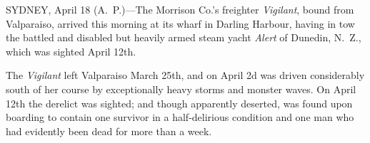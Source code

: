 \documentclass{newspaper1920}
\def\minipageheight{37}
\begin{document}
\begin{multicols}{3}




\halfrule



\halfrule



\halfrule



\halfrule



\halfrule



\fullrule



\halfrule



\halfrule



\columnbreak

\noindent
\begin{minipage}[t][\minipageheight\baselineskip]{2\columnwidth+1\columnsep}
\fancyrule
\vspace{-\baselineskip}
\vspace{-0.5\baselineskip}
\begin{multicols}{2}
SYDNEY, April 18 (A.~P.)---The Morrison Co.'s freighter
\emph{Vigilant}, bound from Valparaiso, arrived this morning at its
wharf in Darling Harbour, having in tow the battled and disabled but
heavily armed steam yacht \emph{Alert} of Dunedin, N.~Z., which was
sighted April 12th.

The \emph{Vigilant} left Valparaiso March 25th, and on April 2d was
driven considerably south of her course by exceptionally heavy storms
and monster waves.  On April 12th the derelict was sighted; and though
apparently deserted, was found upon boarding to contain one survivor
in a half-delirious condition and one man who had evidently been dead
for more than a week.


\end{multicols}
\end{minipage}
\end{multicols}
\end{document}
